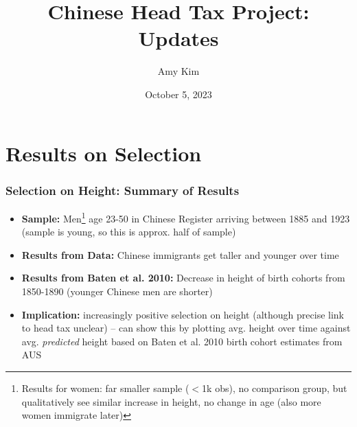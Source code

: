 \documentclass[xcolor=dvipsnames, compress, 12pt, aspectratio=169, handout]{beamer}
\title{Chinese Head Tax Project: Updates}
\author{Amy Kim}
\date{October 5, 2023}
\begin{document}
\begin{frame}[plain]
    \titlepage
\end{frame}


\section{Results on Selection}
\begin{frame}
    \frametitle{Selection on Height: Summary of Results}
    \label{height}
    \begin{itemize}
        \item \textbf{Sample:} Men\footnote{Results for women: far smaller sample ($<$1k obs), no comparison group, but qualitatively see similar increase in height, no change in age (also more women immigrate later)} age 23-50 in Chinese Register arriving between 1885 and 1923 (sample is young, so this is approx. half of sample)
        \vspace{2mm}
        \item \textbf{Results from Data:} Chinese immigrants get taller and younger over time \\ \hyperlink{heightplot1}{} \hyperlink{ageplot1}{}\vspace{2mm}
        \item \textbf{Results from Baten et al. 2010:} Decrease in height of birth cohorts from 1850-1890 (younger Chinese men are shorter) \hyperlink{batenheight}{} \vspace{2mm}
        \item \textbf{Implication:} increasingly positive selection on height (although precise link to head tax unclear) -- can show this by plotting avg. height over time against avg. \textit{predicted} height based on Baten et al. 2010 birth cohort estimates from AUS
        \vspace{2mm}
    \end{itemize}
\end{frame}
\end{document}
